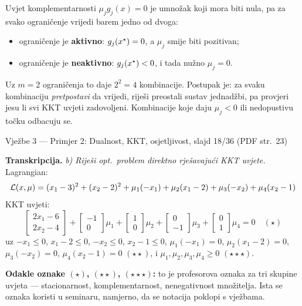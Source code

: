 Uvjet komplementarnosti $\mu_j g_j(x) = 0$ je umnožak koji mora biti nula, pa za
svako ograničenje vrijedi barem jedno od dvoga:
\begin{itemize}[nosep,leftmargin=*]
  \item ograničenje je \textbf{aktivno}: $g_j(x^{\star}) = 0$, a $\mu_j$ smije biti
        pozitivan;
  \item ograničenje je \textbf{neaktivno}: $g_j(x^{\star}) < 0$, i tada nužno
        $\mu_j = 0$.
\end{itemize}
Uz $m = 2$ ograničenja to daje $2^2 = 4$ kombinacije. Postupak je: za svaku
kombinaciju \emph{pretpostavi} da vrijedi, riješi preostali sustav jednadžbi, pa
provjeri jesu li svi KKT uvjeti zadovoljeni. Kombinacije koje daju
$\mu_j < 0$ ili nedopustivu točku odbacuju se.

\begin{izvor}{Vježbe 3 --- Primjer 2: Dualnost, KKT, osjetljivost, slajd 18/36 (PDF str.~23)}

\textbf{Transkripcija.} \emph{b) Riješi opt.\ problem direktno rješavajući KKT
uvjete.} Lagrangian:
\[
\mathcal{L}(x,\mu) = (x_1-3)^2 + (x_2-2)^2 + \mu_1(-x_1) + \mu_2(x_1-2) + \mu_3(-x_2) + \mu_4(x_2-1)
\]
KKT uvjeti:
\[
\begin{bmatrix} 2x_1 - 6 \\ 2x_2 - 4\end{bmatrix}
+ \begin{bmatrix}-1\\0\end{bmatrix}\mu_1
+ \begin{bmatrix}1\\0\end{bmatrix}\mu_2
+ \begin{bmatrix}0\\-1\end{bmatrix}\mu_3
+ \begin{bmatrix}0\\1\end{bmatrix}\mu_4 = 0 \quad (\star)
\]
uz $-x_1 \leq 0$, $x_1 - 2 \leq 0$, $-x_2 \leq 0$, $x_2 - 1 \leq 0$,
$\mu_1(-x_1) = 0$, $\mu_2(x_1-2) = 0$, $\mu_3(-x_2) = 0$, $\mu_4(x_2-1) = 0$
$(\star\star)$, i $\mu_1, \mu_2, \mu_3, \mu_4 \geq 0$ $(\star\star\star)$.

\textbf{Odakle oznake $(\star)$, $(\star\star)$, $(\star\star\star)$:} to je
profesorova oznaka za tri skupine uvjeta --- stacionarnost, komplementarnost,
nenegativnost množitelja. Ista se oznaka koristi u seminaru, namjerno, da se
notacija poklopi s vježbama.
\end{izvor}

